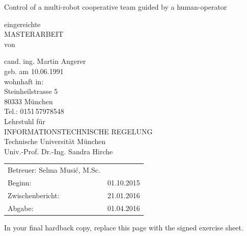 \documentclass[a4paper,twoside, openright,12pt]{report}
\begin{document}
\pagestyle{empty}
\enlargethispage{4.5cm} %
\begin{center}
\phantom{u}
\vspace{0.5cm}
\Huge{\sc Control of a multi-robot cooperative team guided by a human-operator}\\
\vspace{1.5cm}
                                 \large{eingereichte\\
                                 \large{	MASTERARBEIT\\ 
										   von\\}          

						\vspace{0.4cm}
					cand. ing. Martin Angerer\\
						\vspace{0.5cm}
					geb. am 10.06.1991\\
					wohnhaft in:\\
					Steinheilstrasse 5\\
					80333 M\"unchen\\
					Tel.: 0151\,57978548\\
					\vspace{1.5cm}
					Lehrstuhl f\"ur\\
					INFORMATIONSTECHNISCHE REGELUNG \\
					Technische Universit\"at M\"unchen\\
					\vspace{0.6cm}
                    Univ.-Prof. Dr.-Ing. Sandra Hirche}
\end{center}
\vspace{5.0cm}
\begin{tabular}{ll}
Betreuer: Selma Musi\'c, M.Sc.  \\
Beginn: & 01.10.2015  \\
Zwischenbericht: &  21.01.2016  \\
Abgabe: &  01.04.2016 \\
\end{tabular}

\newpage
\cleardoublepage



\phantom{u}
\phantom{1}\vspace{6cm}
\begin{center}
In your final hardback copy, replace this page with the signed exercise sheet.
\end{center}
\end{document}
